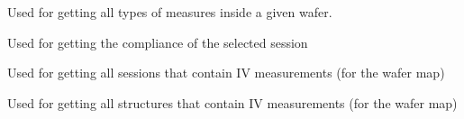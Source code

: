 \documentclass[letterpaper,10pt,english]{sphinxmanual}
\begin{document}

\begin{fulllineitems}
\label{\detokenize{app:app.get_all_types}}
\pysigstartsignatures
{}
\pysigstopsignatures
\sphinxAtStartPar
Used for getting all types of measures inside a given wafer.

\end{fulllineitems}


\begin{fulllineitems}
\label{\detokenize{app:app.get_compl}}
\pysigstartsignatures
{}
\pysigstopsignatures
\sphinxAtStartPar
Used for getting the compliance of the selected session

\end{fulllineitems}


\begin{fulllineitems}
\label{\detokenize{app:app.get_map_sessions_server}}
\pysigstartsignatures
{}
\pysigstopsignatures
\sphinxAtStartPar
Used for getting all sessions that contain I\sphinxhyphen{}V measurements (for the wafer map)

\end{fulllineitems}


\begin{fulllineitems}
\label{\detokenize{app:app.get_map_structures_server}}
\pysigstartsignatures
{}
\pysigstopsignatures
\sphinxAtStartPar
Used for getting all structures that contain I\sphinxhyphen{}V measurements (for the wafer map)

\end{fulllineitems}
\end{document}
